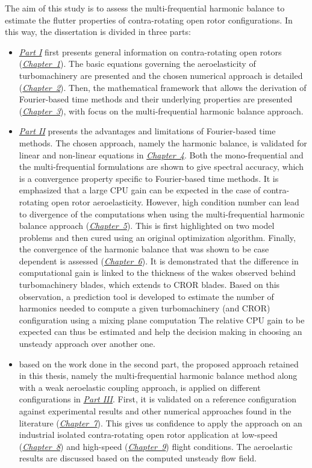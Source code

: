The aim of this study is to assess the
multi-frequential harmonic balance
to estimate the flutter properties of contra-rotating open rotor
configurations. In this way, the dissertation is divided in three parts:
\begin{itemize}
	\item \hyperref[part1]{\emph{Part I}} first presents general information on 
	contra-rotating open rotors (\hyperref[cha:cror]{\emph{Chapter~1}}).
	The basic equations governing the aeroelasticity of
	turbomachinery are presented and the chosen numerical approach 
	is detailed (\hyperref[cha:ael]{\emph{Chapter~2}}).
	Then, the mathematical framework that allows the derivation
	of Fourier-based time methods and their underlying properties
	are presented (\hyperref[cha:spectral_methods]{\emph{Chapter~3}}),
	with focus on the multi-frequential harmonic balance approach.
	\item \hyperref[part2]{\emph{Part II}} 
	presents the advantages and limitations
	of Fourier-based time methods. The chosen approach, namely
	the harmonic balance, is validated for linear and non-linear
	equations in \hyperref[cha:validation_hb]{\emph{Chapter~4}}. Both the
	mono-frequential and the multi-frequential formulations
	are shown to give spectral accuracy, which is a convergence
	property specific to Fourier-based time methods.
	It is emphasized
	that a large CPU gain can be expected in the
	case of contra-rotating open rotor aeroelasticity. 
	However, high condition number can lead to divergence
	of the computations when using the multi-frequential harmonic
	balance approach
	(\hyperref[cha:limitations_condition_number]{\emph{Chapter~5}}). This is 
	first highlighted on two model problems and then cured using
	an original optimization algorithm.
	Finally, the convergence of the harmonic balance 
	that was shown to be case dependent is
	assessed (\hyperref[cha:limitations_convergence]{\emph{Chapter~6}}). 
	It is demonstrated that the difference in computational
	gain is linked to the thickness of the wakes observed behind
	turbomachinery blades, which extends to CROR blades. Based on this observation,
	a prediction tool is developed to estimate the
	number of harmonics needed to compute a given turbomachinery (and CROR)
	configuration using a mixing plane computation 
	The relative CPU gain to be expected can thus be estimated
	and help the decision making in choosing an unsteady approach
	over another one.
	\item based on the work done in the second part,
	the proposed approach retained in this thesis, 
	namely the multi-frequential harmonic balance method along with a weak 
	aeroelastic coupling approach, is applied on different configurations
	in \hyperref[part3]{\emph{Part III}}. First, it is validated 
	on a reference configuration against experimental 
	results and other numerical approaches found in the literature
	(\hyperref[cha:stcf11]{\emph{Chapter~7}}). This gives us confidence
	to apply the approach on an industrial isolated contra-rotating
	open rotor application at low-speed (\hyperref[cha:dream_ls_isolated]{\emph{Chapter~8}})
	and high-speed (\hyperref[cha:dream_hs_isolated]{\emph{Chapter~9}})
	flight conditions. The aeroelastic results are discussed based
	on the computed unsteady flow field.
\end{itemize}
